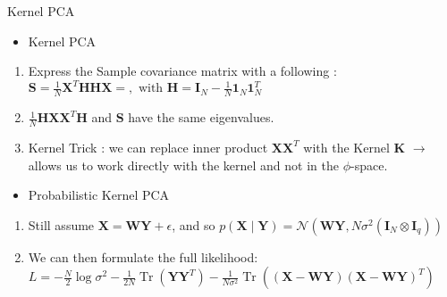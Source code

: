 \documentclass[fleqn]{beamer}
\begin{document}
\begin{frame}{Kernel PCA}
    \begin{itemize}
        \item Kernel PCA
    \end{itemize}
    \begin{enumerate}
        \setlength\itemsep{1em}
        \item Express the Sample covariance matrix with a following : $ \mathbf{S} = \frac{1}{N} \mathbf{X} ^T \mathbf{H} \mathbf{H} \mathbf{X} = , \text{ with }  \mathbf{H} = \mathbf{I}_N -\frac{1}{N} \mathbf{1}_N \mathbf{1}_N^T  $
        \item $\frac{1}{N} \mathbf{H}  \mathbf{X} \mathbf{X}^T \mathbf{H}$ and $\mathbf{S}$ have the same eigenvalues.
        \item Kernel Trick : we can replace inner product $\mathbf{X} \mathbf{X}^T$ with the Kernel $\mathbf{K}$ $\rightarrow$ allows us to work directly with the kernel and not in the $\phi$-space. 
    \end{enumerate}
    \pause
    \begin{itemize}
        \item Probabilistic Kernel PCA  \cite{pkpca}
    \end{itemize}
    \begin{enumerate}
        \item Still assume $ \mathbf{X} = \mathbf{W} \mathbf{Y} + \epsilon$, and so $p(\mathbf{X} \mid \mathbf{Y}) = \mathcal{N}(\mathbf{W} \mathbf{Y},N \sigma^2 (\mathbf{I}_N \otimes \mathbf{I}_q ) ) $
        \item We can then formulate the full likelihood: $ L = - \frac{N}{2}  \log \sigma^2  - \frac{1}{2N} \operatorname{Tr}(\mathbf{Y} \mathbf{Y}^T) -  \frac{1}{N \sigma^2} \operatorname{Tr}((\mathbf{X} - \mathbf{W} \mathbf{Y})(\mathbf{X} - \mathbf{W} \mathbf{Y})^T)$
    \end{enumerate}


\end{frame}
\end{document}
